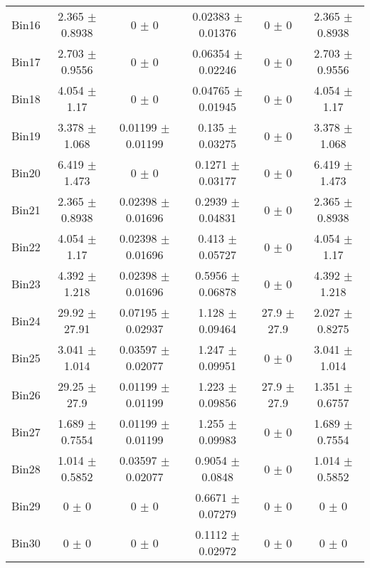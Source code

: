 \begin{tabular}{@{\extracolsep{4pt}}lccccc@{}}
     Bin16 & 2.365 $\pm$ 0.8938 & 0 $\pm$ 0 & 0.02383 $\pm$ 0.01376 & 0 $\pm$ 0 & 2.365 $\pm$ 0.8938 \\ 
     Bin17 & 2.703 $\pm$ 0.9556 & 0 $\pm$ 0 & 0.06354 $\pm$ 0.02246 & 0 $\pm$ 0 & 2.703 $\pm$ 0.9556 \\ 
     Bin18 & 4.054 $\pm$ 1.17 & 0 $\pm$ 0 & 0.04765 $\pm$ 0.01945 & 0 $\pm$ 0 & 4.054 $\pm$ 1.17 \\ 
     Bin19 & 3.378 $\pm$ 1.068 & 0.01199 $\pm$ 0.01199 & 0.135 $\pm$ 0.03275 & 0 $\pm$ 0 & 3.378 $\pm$ 1.068 \\ 
     Bin20 & 6.419 $\pm$ 1.473 & 0 $\pm$ 0 & 0.1271 $\pm$ 0.03177 & 0 $\pm$ 0 & 6.419 $\pm$ 1.473 \\ 
     Bin21 & 2.365 $\pm$ 0.8938 & 0.02398 $\pm$ 0.01696 & 0.2939 $\pm$ 0.04831 & 0 $\pm$ 0 & 2.365 $\pm$ 0.8938 \\ 
     Bin22 & 4.054 $\pm$ 1.17 & 0.02398 $\pm$ 0.01696 & 0.413 $\pm$ 0.05727 & 0 $\pm$ 0 & 4.054 $\pm$ 1.17 \\ 
     Bin23 & 4.392 $\pm$ 1.218 & 0.02398 $\pm$ 0.01696 & 0.5956 $\pm$ 0.06878 & 0 $\pm$ 0 & 4.392 $\pm$ 1.218 \\ 
     Bin24 & 29.92 $\pm$ 27.91 & 0.07195 $\pm$ 0.02937 & 1.128 $\pm$ 0.09464 & 27.9 $\pm$ 27.9 & 2.027 $\pm$ 0.8275 \\ 
     Bin25 & 3.041 $\pm$ 1.014 & 0.03597 $\pm$ 0.02077 & 1.247 $\pm$ 0.09951 & 0 $\pm$ 0 & 3.041 $\pm$ 1.014 \\ 
     Bin26 & 29.25 $\pm$ 27.9 & 0.01199 $\pm$ 0.01199 & 1.223 $\pm$ 0.09856 & 27.9 $\pm$ 27.9 & 1.351 $\pm$ 0.6757 \\ 
     Bin27 & 1.689 $\pm$ 0.7554 & 0.01199 $\pm$ 0.01199 & 1.255 $\pm$ 0.09983 & 0 $\pm$ 0 & 1.689 $\pm$ 0.7554 \\ 
     Bin28 & 1.014 $\pm$ 0.5852 & 0.03597 $\pm$ 0.02077 & 0.9054 $\pm$ 0.0848 & 0 $\pm$ 0 & 1.014 $\pm$ 0.5852 \\ 
     Bin29 & 0 $\pm$ 0 & 0 $\pm$ 0 & 0.6671 $\pm$ 0.07279 & 0 $\pm$ 0 & 0 $\pm$ 0 \\ 
     Bin30 & 0 $\pm$ 0 & 0 $\pm$ 0 & 0.1112 $\pm$ 0.02972 & 0 $\pm$ 0 & 0 $\pm$ 0 \\ 
\hline\hline
  \end{tabular}
